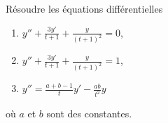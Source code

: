 

\begin{exercice}\label{exo_II-1-14}

Résoudre les équations différentielles
\begin{enumerate}
\item\label{ItemII114a} $y''+\frac{ 3y' }{ t+1 }+\frac{ y }{ (t+1)^2 }=0$,
\item\label{ItemII114b}  $y''+\frac{ 3y' }{ t+1 }+\frac{ y }{ (t+1)^2 }=1$,
\item $y''=\frac{ a+b-1 }{ t }y'-\frac{ ab }{ t^2 }y$
\end{enumerate}
où $a$ et $b$ sont des constantes.

\end{exercice}
